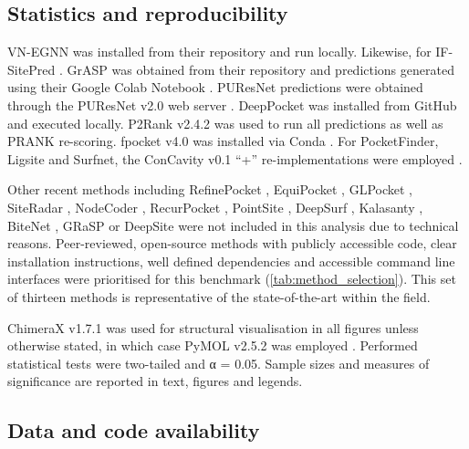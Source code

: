 \vspace{-12pt} %
\vspace{-12pt} %

\subsection{Statistics and reproducibility}
\label{subsub:stats_repro}

VN-EGNN was installed from their repository \cite{VNEGNN_REPO} and run locally. Likewise, for IF-SitePred \cite{IFSP_REPO}. GrASP was obtained from their repository \cite{GRASP_REPO} and predictions generated using their Google Colab Notebook \cite{GRASP_COLAB}. PUResNet predictions were obtained through the PUResNet v2.0 web server \cite{PURESNET_SERVER}. DeepPocket was installed from GitHub \cite{DEEPPOCKET_REPO} and executed locally. P2Rank v2.4.2 \cite{P2RANK_REPO} was used to run all predictions as well as PRANK re-scoring. fpocket v4.0 was installed via Conda \cite{FPOCKET_CONDA}. For PocketFinder, Ligsite and Surfnet, the ConCavity v0.1 ``+'' re-implementations were employed \cite{CONCAVITY_SITE}.

Other recent methods including RefinePocket \cite{LIU_2023_REFINEPOCKET}, EquiPocket \cite{ZHANG_2024_EQUIPOCKET}, GLPocket \cite{LI_2023_GLPOCKET}, SiteRadar \cite{EVTEEV_2023_SITERADAR}, NodeCoder \cite{ABDOLLAHI_2023_NODECODER}, RecurPocket \cite{LI_2022_RECURPOCKET}, PointSite \cite{YAN_2022_POINTSITE}, DeepSurf \cite{MYOLNAS_2021_DEEPSURF}, Kalasanty \cite{STEPNIEWSKA_2020_KALASANTY}, BiteNet \cite{KOZLOVSKII_2020_BITENET}, GRaSP \cite{SANTANA_2020_GRaSP} or DeepSite \cite{JIMENEZ_2017_DEEPSITE} were not included in this analysis due to technical reasons. Peer-reviewed, open-source methods with publicly accessible code, clear installation instructions, well defined dependencies and accessible command line interfaces were prioritised for this benchmark (\autoref{tab:method_selection}). This set of thirteen methods is representative of the state-of-the-art within the field.

ChimeraX v1.7.1 \cite{PETTERSEN_2021_CHIMERAX} was used for structural visualisation in all figures unless otherwise stated, in which case PyMOL v2.5.2 was employed \cite{SCHRODINGER_2015_PYMOL}. Performed statistical tests were two-tailed and α = 0.05. Sample sizes and measures of significance are reported in text, figures and legends.

\subsection{Data and code availability}

